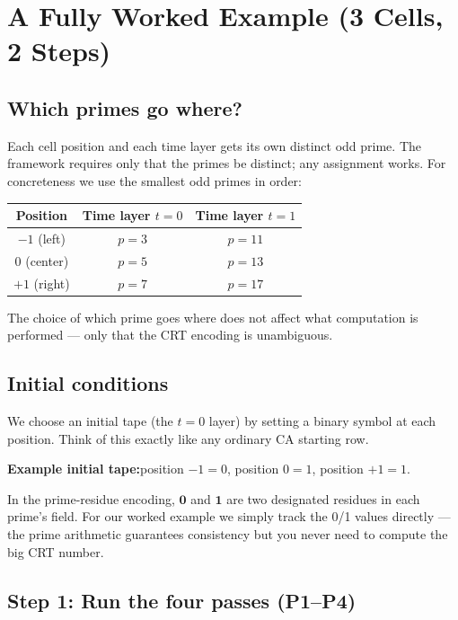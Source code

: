 \documentclass[11pt,a4paper]{article}
\begin{document}
\section{A Fully Worked Example (3 Cells, 2 Steps)}

\subsection{Which primes go where?}

Each cell position and each time layer gets its own distinct odd prime.  The
framework requires only that the primes be distinct; any assignment works.
For concreteness we use the smallest odd primes in order:

\begin{center}
\begin{tabular}{ccc}
\toprule
Position & Time layer $t=0$ & Time layer $t=1$ \\
\midrule
$-1$ (left) & $p=3$ & $p=11$ \\
$0$ (center) & $p=5$ & $p=13$ \\
$+1$ (right) & $p=7$ & $p=17$ \\
\bottomrule
\end{tabular}
\end{center}

\noindent
The choice of which prime goes where does not affect what computation is
performed — only that the CRT encoding is unambiguous.

\subsection{Initial conditions}

We choose an initial tape (the $t=0$ layer) by setting a binary symbol at
each position.  Think of this exactly like any ordinary CA starting row.

\textbf{Example initial tape:}\quad position $-1 = 0$,\; position $0 = 1$,\;
position $+1 = 1$.

In the prime-residue encoding, $\mathbf{0}$ and $\mathbf{1}$ are two
designated residues in each prime's field.  For our worked example we
simply track the 0/1 values directly — the prime arithmetic guarantees
consistency but you never need to compute the big CRT number.

\subsection{Step 1: Run the four passes (P1–P4)}
\end{document}
